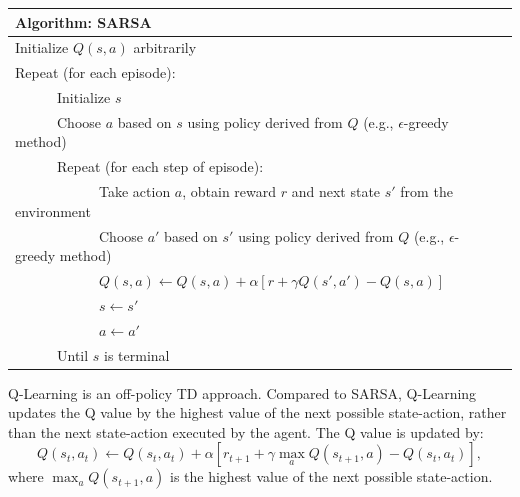 \begin{center}
\begin{tabular}{@{}lp{6cm}@{}}
\hline
Algorithm: SARSA\\
\hline
Initialize $Q(s, a)$ arbitrarily\\
Repeat (for each episode):\\
\ \ \ \ \ \ Initialize $s$\\
\ \ \ \ \ \ Choose $a$ based on $s$ using policy derived from $Q$ (e.g., $\epsilon$-greedy method)\\
\ \ \ \ \ \ Repeat (for each step of episode):\\
\ \ \ \ \ \ \ \ \ \ \ \ Take action $a$, obtain reward $r$ and next state $s'$ from the environment\\
\ \ \ \ \ \ \ \ \ \ \ \ Choose $a'$ based on $s'$ using policy derived from $Q$ (e.g., $\epsilon$-greedy method)\\
\ \ \ \ \ \ \ \ \ \ \ \ $Q(s, a) \leftarrow Q(s, a) + \alpha [r + \gamma Q(s', a')-Q(s, a)]$\\
\ \ \ \ \ \ \ \ \ \ \ \ $s \leftarrow s'$\\
\ \ \ \ \ \ \ \ \ \ \ \ $a \leftarrow a'$\\
\ \ \ \ \ \ Until $s$ is terminal\\
\hline  
\end{tabular}
\end{center}


Q-Learning is an off-policy TD approach. Compared to SARSA, Q-Learning updates
the Q value by the highest value of the next possible state-action, rather than the 
next state-action executed by the agent.  
The Q value is updated by:
\begin{displaymath}
   Q(s_t, a_t) \leftarrow Q(s_t, a_t) + \alpha [r_{t+1}+\gamma \max_a Q(s_{t+1},a)-Q(s_t,a_t)],
\end{displaymath}
where $\max_a Q(s_{t+1},a)$ is the highest value of the next possible state-action. 


